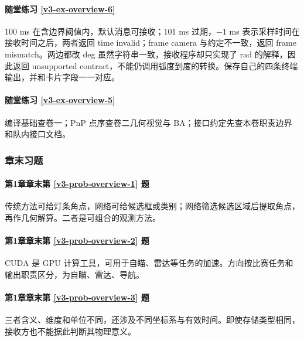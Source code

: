 \paragraph*{随堂练习 \ref{v3-ex-overview-6}}
\begin{solution}
100 ms 在含边界阈值内，默认消息可接收；101 ms 过期，$-1$ ms 表示采样时间在接收时间之后，两者返回 time invalid；frame camera 与约定不一致，返回 frame mismatch。两边都改 deg 虽然字符串一致，接收程序却只实现了 rad 的解释，因此返回 unsupported contract，不能仍调用弧度到度的转换。保存自己的四条终端输出，并和卡片字段一一对应。
\end{solution}

\paragraph*{随堂练习 \ref{v3-ex-overview-5}}
\begin{solution}
编译基础查卷一；PnP 点序查卷二几何视觉与 BA；接口约定先查本卷职责边界和队内接口文档。
\end{solution}

\subsubsection*{章末习题}
\paragraph*{第1章章末第 \ref{v3-prob-overview-1} 题}
\begin{solution}
传统方法可给灯条角点，网络可给候选框或类别；网络筛选候选区域后提取角点，再作几何解算。二者是可组合的观测方法。
\end{solution}

\paragraph*{第1章章末第 \ref{v3-prob-overview-2} 题}
\begin{solution}
CUDA 是 GPU 计算工具，可用于自瞄、雷达等任务的加速。方向按比赛任务和输出职责区分，为自瞄、雷达、导航。
\end{solution}

\paragraph*{第1章章末第 \ref{v3-prob-overview-3} 题}
\begin{solution}
三者含义、维度和单位不同，还涉及不同坐标系与有效时间。即使存储类型相同，接收方也不能据此判断其物理意义。
\end{solution}

